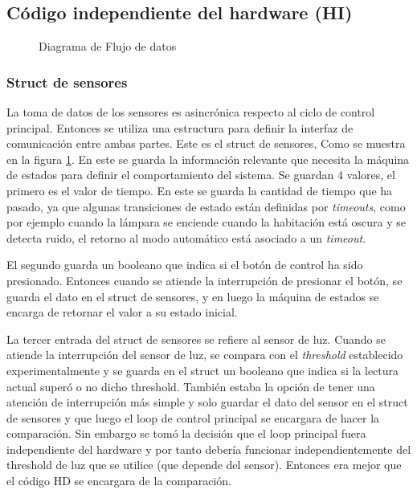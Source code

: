 \subsection{Código independiente del hardware (HI)}

\begin{figure}
\centering
\scalebox{.5}{}
\caption{Diagrama de Flujo de datos}
\label{fig:data_flow}
\end{figure}


\subsubsection{Struct de sensores}
La toma de datos de los sensores es asincrónica respecto al ciclo de control principal. Entonces se
utiliza una estructura para definir la interfaz de comunicación entre ambas partes. Este es el
struct de sensores, Como se muestra en la figura \ref{fig:data_flow}. En este se guarda la
información relevante que necesita la máquina de estados para definir el comportamiento del
sistema. Se guardan 4 valores, el primero es el valor de tiempo. En este se guarda la cantidad de
tiempo que ha pasado, ya que algunas transiciones de estado están definidas por \textit{timeouts},
como por ejemplo cuando la lámpara se enciende cuando la habitación está oscura y se detecta ruido,
el retorno al modo automático está asociado a un \textit{timeout}.

El segundo guarda un booleano que indica si el botón de control ha sido presionado. Entonces cuando
se atiende la interrupción de presionar el botón, se guarda el dato en el struct de sensores, y
en luego la máquina de estados se encarga de retornar el valor a su estado inicial.

La tercer entrada del struct de sensores se refiere al sensor de luz. Cuando se atiende la
interrupción del sensor de luz, se compara con el \textit{threshold} establecido experimentalmente y
se guarda en el struct un booleano que indica si la lectura actual superó o no dicho
threshold. También estaba la opción de tener una atención de interrupción más simple y solo guardar
el dato del sensor en el struct de sensores y que luego el loop de control principal se encargara de
hacer la comparación. Sin embargo se tomó la decisión que el loop principal fuera independiente del
hardware y por tanto debería funcionar independientemente del threshold de luz que se utilice (que
depende del sensor). Entonces era mejor que el código HD se encargara de la comparación.

